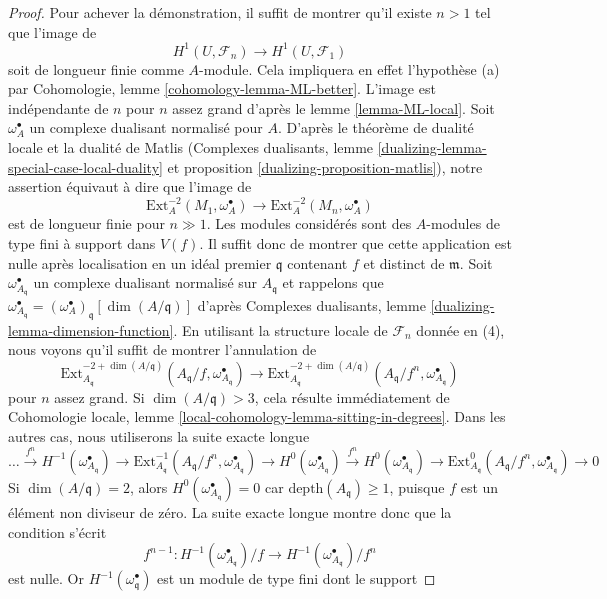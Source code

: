 \begin{proof}
\medskip\noindent
Pour achever la démonstration, il suffit de montrer qu'il existe $n > 1$
tel que l'image de
$$
H^1(U, \mathcal{F}_n) \longrightarrow H^1(U, \mathcal{F}_1)
$$
soit de longueur finie comme $A$-module. Cela impliquera en effet l'hypothèse (a)
par Cohomologie, lemme \ref{cohomology-lemma-ML-better}. L'image est indépendante
de $n$ pour $n$ assez grand d'après le lemme \ref{lemma-ML-local}.
Soit $\omega_A^\bullet$ un complexe dualisant normalisé pour $A$.
D'après le théorème de dualité locale et la dualité de Matlis
(Complexes dualisants, lemme \ref{dualizing-lemma-special-case-local-duality}
et proposition \ref{dualizing-proposition-matlis}),
notre assertion équivaut à dire que l'image de
$$
\text{Ext}^{-2}_A(M_1, \omega_A^\bullet) \to
\text{Ext}^{-2}_A(M_n, \omega_A^\bullet)
$$
est de longueur finie pour $n \gg 1$. Les modules considérés sont des
$A$-modules de type fini à support dans $V(f)$. Il suffit donc de montrer que cette
application est nulle après localisation en un idéal premier $\mathfrak q$
contenant $f$ et distinct de $\mathfrak m$.
Soit $\omega_{A_\mathfrak q}^\bullet$ un complexe
dualisant normalisé sur $A_\mathfrak q$ et rappelons que
$\omega_{A_\mathfrak q}^\bullet =
(\omega_A^\bullet)_\mathfrak q[\dim(A/\mathfrak q)]$ d'après
Complexes dualisants, lemme \ref{dualizing-lemma-dimension-function}.
En utilisant la structure locale de $\mathcal{F}_n$ donnée en (4),
nous voyons qu'il suffit de montrer l'annulation de
$$
\text{Ext}^{-2 + \dim(A/\mathfrak q)}_{A_\mathfrak q}(
A_\mathfrak q/f, \omega_{A_\mathfrak q}^\bullet)
\to
\text{Ext}^{-2 + \dim(A/\mathfrak q)}_{A_\mathfrak q}(
A_\mathfrak q/f^n, \omega_{A_\mathfrak q}^\bullet)
$$
pour $n$ assez grand. Si $\dim(A/\mathfrak q) > 3$, cela résulte immédiatement de
Cohomologie locale, lemme \ref{local-cohomology-lemma-sitting-in-degrees}.
Dans les autres cas, nous utiliserons la suite exacte longue
$$
\ldots
\xrightarrow{f^n}
H^{-1}(\omega_{A_\mathfrak q}^\bullet)
\to
\text{Ext}^{-1}_{A_\mathfrak q}(
A_\mathfrak q/f^n, \omega_{A_\mathfrak q}^\bullet) \to
H^0(\omega_{A_\mathfrak q}^\bullet)
\xrightarrow{f^n}
H^0(\omega_{A_\mathfrak q}^\bullet)
\to
\text{Ext}^0_{A_\mathfrak q}(
A_\mathfrak q/f^n, \omega_{A_\mathfrak q}^\bullet) \to 0
$$
Si $\dim(A/\mathfrak q) = 2$, alors
$H^0(\omega_{A_\mathfrak q}^\bullet) = 0$
car $\text{depth}(A_\mathfrak q) \geq 1$, puisque
$f$ est un élément non diviseur de zéro.
La suite exacte longue montre donc que la condition s'écrit
$$
f^{n - 1} :
H^{-1}(\omega_{A_\mathfrak q}^\bullet)/f \to
H^{-1}(\omega_{A_\mathfrak q}^\bullet)/f^n
$$
est nulle. Or $H^{-1}(\omega^\bullet_\mathfrak q)$ est un module de type fini dont le support

\end{proof}

